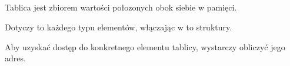 \subsection{\Conclusion{}}

Tablica jest zbiorem wartości połozonych obok siebie w pamięci.

Dotyczy to każdego typu elementów, włączając w to struktury.

Aby uzyskać dostęp do konkretnego elementu tablicy, wystarczy obliczyć jego adres.


